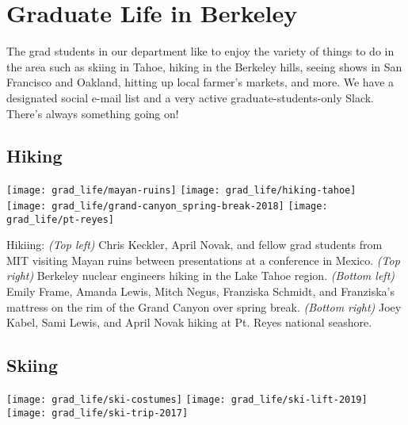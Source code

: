 
\newpage
{}
\section*{Graduate Life in Berkeley}
The grad students in our department like to enjoy the variety of things to do in the area such as skiing in Tahoe, hiking in the Berkeley hills, seeing shows in San Francisco and Oakland, hitting up local farmer's markets, and more.
We have a designated social e-mail list and a very active graduate-students-only Slack. There’s always something going on!

\subsection*{Hiking}

\begin{minipage}{\textwidth}
  \begin{center}
  	\texttt{[image: grad\_life/mayan-ruins]}
	\texttt{[image: grad\_life/hiking-tahoe]}\\
	\texttt{[image: grad\_life/grand-canyon\_spring-break-2018]}
    \texttt{[image: grad\_life/pt-reyes]}
  \end{center}
\end{minipage}

Hikiing: 
\textit{(Top left)} Chris Keckler, April Novak, and fellow grad students from MIT visiting Mayan ruins between presentations at a conference in Mexico. 
\textit{(Top right)} Berkeley nuclear engineers hiking in the Lake Tahoe region. 
\textit{(Bottom left)} Emily Frame, Amanda Lewis, Mitch Negus, Franziska Schmidt, and Franziska's mattress on the rim of the Grand Canyon over spring break. 
\textit{(Bottom right)} Joey Kabel, Sami Lewis, and April Novak hiking at Pt. Reyes national seashore.


\subsection*{Skiing}

\begin{minipage}{\textwidth}
  \begin{center}
    \texttt{[image: grad\_life/ski-costumes]}\hfill
    \texttt{[image: grad\_life/ski-lift-2019]}\\
    \vspace{0.5cm}
    \texttt{[image: grad\_life/ski-trip-2017]}
  \end{center}
\end{minipage}

